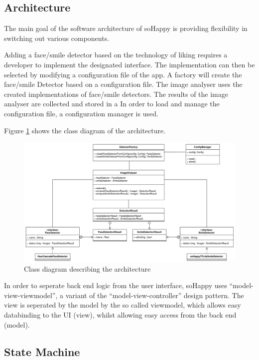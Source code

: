\subsection{Architecture} \label{sec:architecture}

The main goal of the software architecture of soHappy is providing flexibility 
in switching out various components.

Adding a face/smile detector based on the technology of liking requires a
developer to implement the designated interface. The implementation can then be 
selected by modifying a configuration file of the app. A factory will create 
the face/smile Detector based on a configuration file. 
The image analyser uses the created implementations of face/smile
detectors. The results of the image analyser are collected and stored in a
In order to load and manage the configuration file, a configuration manager 
is used.

Figure \ref{fig:arch1} shows the class diagram of the architecture.

\begin{figure}
    \includegraphics[width=\linewidth]{figures/methodology_architecture_1.png}
    \caption{Class diagram describing the architecture}
    \label{fig:arch1}
\end{figure}

In order to seperate back end logic from the user interface, soHappy uses
``model-view-viewmodel'', a variant of the ``model-view-controller'' design 
pattern. The view is seperated by the model by the so called viewmodel, which
allows easy databinding to the UI (view), whilst allowing easy access from the
back end (model). \cite{mvvm}

\subsection{State Machine} \label{sec:state_machine}

